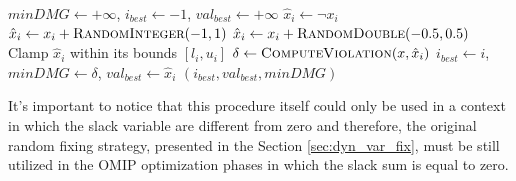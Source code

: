 \begin{algorithm}[H]
\begin{algorithmic}[1]
    \State $minDMG \gets +\infty$, $i_{best} \gets -1$, $val_{best} \gets +\infty$
         $\hat{x}_i \gets \neg x_i$
         $\hat{x}_i \gets x_i + \Call{RandomInteger}{-1,1}$
         $\hat{x}_i \gets x_i + \Call{RandomDouble}{-0.5,0.5}$
        \EndIf
        \State Clamp $\hat{x}_i$ within its bounds $[l_i,u_i]$
        \State $\delta \gets \Call{ComputeViolation}{x,\hat{x}_i}$
            \State $i_{best} \gets i$, $minDMG \gets \delta$, $val_{best} \gets \hat{x}_i$
        \EndIf
    \EndFor
    \State \Return $(i_{best}, val_{best}, minDMG)$
\EndFunction
\end{algorithmic}
\end{algorithm}





It's important to notice that this procedure itself could only be used in a context in which the slack variable are different from zero and therefore, the original random fixing strategy, presented in the Section \ref{sec:dyn_var_fix}, must be still utilized in the OMIP optimization phases in which the slack sum is equal to zero.


